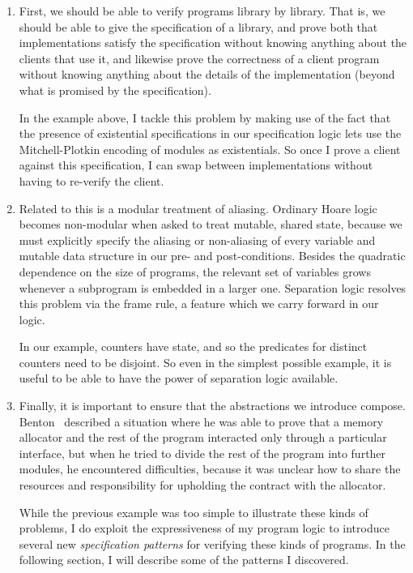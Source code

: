 \begin{enumerate}
\item First, we should be able to verify programs library by
  library. That is, we should be able to give the specification of a
  library, and prove both that implementations satisfy the
  specification without knowing anything about the clients that use
  it, and likewise prove the correctness of a client program without
  knowing anything about the details of the implementation (beyond
  what is promised by the specification). 

  In the example above, I tackle this problem by making use of the
  fact that the presence of existential specifications in our
  specification logic lets use the Mitchell-Plotkin encoding of
  modules as existentials. So once I prove a client against this
  specification, I can swap between implementations without having
  to re-verify the client. 

\item Related to this is a modular treatment of aliasing. Ordinary
  Hoare logic becomes non-modular when asked to treat mutable, shared
  state, because we must explicitly specify the aliasing or
  non-aliasing of every variable and mutable data structure in our
  pre- and post-conditions. Besides the quadratic dependence on the
  size of programs, the relevant set of variables grows whenever a
  subprogram is embedded in a larger one. Separation logic resolves
  this problem via the frame rule, a feature which we carry forward in
  our logic.

  In our example, counters have state, and so the predicates for
  distinct counters need to be disjoint. So even in the simplest
  possible example, it is useful to be able to have the power of
  separation logic available.

\item Finally, it is important to ensure that the abstractions we
  introduce compose. Benton~\cite{benton-modularity} described a
  situation where he was able to prove that a memory allocator and the
  rest of the program interacted only through a particular interface,
  but when he tried to divide the rest of the program into further
  modules, he encountered difficulties, because it was unclear how to
  share the resources and responsibility for upholding the contract
  with the allocator.

  While the previous example was too simple to illustrate these kinds
  of problems, I do exploit the expressiveness of my program logic to
  introduce several new \emph{specification patterns} for verifying
  these kinds of programs. In the following section, I will describe
  some of the patterns I discovered.
\end{enumerate}

